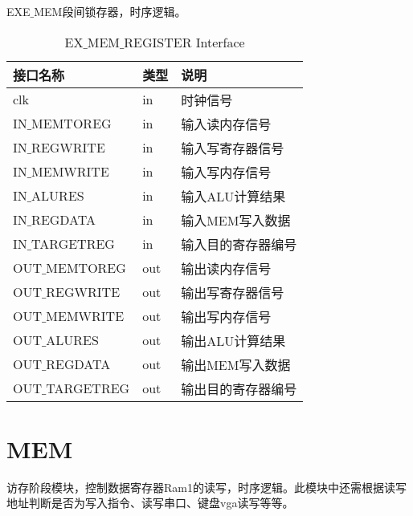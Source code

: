 EXE$\_$MEM段间锁存器，时序逻辑。

\begin{center}
\renewcommand{\arraystretch}{1.3}
\small
\begin{longtable}{|p{3cm}<{\centering}|p{1.4cm}<{\centering}|p{7cm}<{\centering}|}
\caption{EX$\_$MEM$\_$REGISTER Interface}
\label{tab:treatments}\\
\hline
接口名称 & 类型 & 说明 \\
\hline
clk & in & 时钟信号 \\
\hline
IN$\_$MEMTOREG & in & 输入读内存信号 \\
\hline
IN$\_$REGWRITE & in & 输入写寄存器信号 \\
\hline
IN$\_$MEMWRITE & in & 输入写内存信号 \\
\hline
IN$\_$ALURES & in & 输入ALU计算结果 \\
\hline
IN$\_$REGDATA & in & 输入MEM写入数据 \\
\hline
IN$\_$TARGETREG & in & 输入目的寄存器编号 \\
\hline
OUT$\_$MEMTOREG & out & 输出读内存信号 \\
\hline
OUT$\_$REGWRITE & out & 输出写寄存器信号 \\
\hline
OUT$\_$MEMWRITE & out & 输出写内存信号 \\
\hline
OUT$\_$ALURES & out & 输出ALU计算结果 \\
\hline
OUT$\_$REGDATA & out & 输出MEM写入数据 \\
\hline
OUT$\_$TARGETREG & out & 输出目的寄存器编号 \\
\hline
\end{longtable}
\end{center}


\section{MEM}

访存阶段模块，控制数据寄存器Ram1的读写，时序逻辑。此模块中还需根据读写地址判断是否为写入指令、读写串口、键盘vga读写等等。

